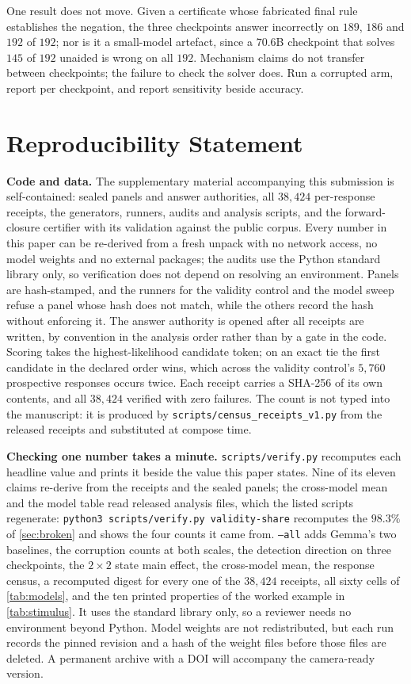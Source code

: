 \documentclass{article}
\begin{document}
One result does not move. Given a certificate whose fabricated final rule
establishes the negation, the three checkpoints answer incorrectly on $189$,
$186$ and $192$ of $192$; nor is it a small-model artefact,
since a $70.6$B checkpoint that solves $145$ of $192$ unaided is wrong on all
$192$. Mechanism claims do not transfer between checkpoints; the failure to
check the solver does. Run a corrupted arm, report per checkpoint, and report
sensitivity beside accuracy.

\section*{Reproducibility Statement}

\textbf{Code and data.} The supplementary material accompanying this submission
is self-contained: sealed panels and answer authorities, all $38{,}424$
per-response receipts, the generators, runners, audits and analysis scripts, and
the forward-closure certifier with its validation against the public corpus.
Every number in this paper can be re-derived from a fresh unpack with no network
access, no model weights and no external packages; the audits use the Python standard
library only, so verification does not depend on resolving an
environment. Panels are hash-stamped, and the runners for the validity control and the model sweep refuse a panel
whose hash does not match, while the others record the hash without enforcing it.
The answer authority is opened after all receipts are written, by convention in
the analysis order rather than by a gate in the code. Scoring takes the
highest-likelihood candidate token; on an exact tie the first candidate in the
declared order wins, which across the validity control's $5{,}760$ prospective responses
occurs twice. Each receipt carries a SHA-256 of its own contents,
and all $38{,}424$ verified with zero failures. The count is not typed into the manuscript: it is
produced by \texttt{scripts/census\_receipts\_v1.py} from the released receipts
and substituted at compose time.

\textbf{Checking one number takes a minute.} \texttt{scripts/verify.py} recomputes each headline value and prints it beside the
value this paper states. Nine of its eleven claims re-derive
from the receipts and the sealed panels; the cross-model mean and the model table
read released analysis files, which the listed scripts regenerate:
\texttt{python3 scripts/verify.py validity-share} recomputes the $98.3\%$ of
\cref{sec:broken} and shows the four counts it came from.
\texttt{--all} adds Gemma's two baselines, the corruption counts at both scales,
the detection direction on three checkpoints, the $2\times2$ state main effect,
the cross-model mean, the response census, a recomputed digest for every one of
the $38{,}424$ receipts, all sixty cells of \cref{tab:models}, and the
ten printed properties of the worked example in \cref{tab:stimulus}. It uses the
standard library only, so a reviewer needs no environment beyond Python. Model weights are not redistributed, but each run records the
pinned revision and a hash of the weight files before those files are deleted. A
permanent archive with a DOI will accompany the camera-ready version.
\end{document}

